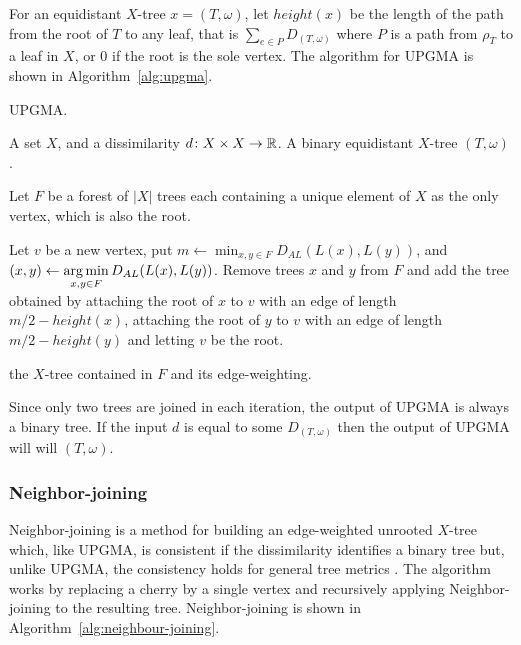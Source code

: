 For an equidistant $X$-tree $x = (T,\omega)$, let $height(x)$ be the length of
the path from the root of $T$ to any leaf, that is $\sum_{e \in P}
D_{(T,\omega)}$ where $P$ is a path from $\rho_T$ to a leaf in $X$, or 0 if
the root is the sole vertex.  The algorithm for UPGMA is shown in
Algorithm~\ref{alg:upgma}.

\begin{algorithm}[h]
  \caption{UPGMA.}
  \label{alg:upgma}

  \begin{algorithmic}
    \Require A set $X$, and a dissimilarity $d \colon X \times X \to {\mathbb R}$.
    \Ensure  A binary equidistant $X$-tree $(T, \omega)$.

    \State Let $F$ be a forest of $|X|$ trees each containing a unique element
    of $X$ as the only vertex, which is also the root.


       \State Let $v$ be a new vertex,
       \State put $\displaystyle m \gets \min_{x,y \in F} D_{AL}(L(x),L(y))$,
       \State and $\displaystyle (x,y) \gets \operatorname*{arg\,min}_{x,y \in F} D_{AL}(L(x),L(y))$.
       \State Remove trees $x$ and $y$ from $F$ and add the tree obtained by
         attaching the root of $x$ to $v$ with an edge of length $m/2 -
         height(x)$, attaching the root of $y$ to $v$ with an edge of length
         $m/2 - height(y)$ and letting $v$ be the root.
    
    \EndWhile

    \State \Return the $X$-tree contained in $F$ and its edge-weighting.
  \end{algorithmic}
\end{algorithm}

Since only two trees are joined in each iteration, the output of UPGMA is
always a binary tree.  If the input $d$ is equal to some $D_{(T,\omega)}$ then
the output of UPGMA will will $(T,\omega)$.

\subsubsection{Neighbor-joining}
\label{sec:neighbour-joining}

Neighbor-joining is a method for building an edge-weighted unrooted $X$-tree
which, like UPGMA, is consistent if the dissimilarity identifies a binary tree
but, unlike UPGMA, the consistency holds for general tree metrics
\cite{saitou1987nj}.  The algorithm works by replacing a cherry by a single
vertex and recursively applying Neighbor-joining to the resulting tree.
Neighbor-joining is shown in Algorithm~\ref{alg:neighbour-joining}.

